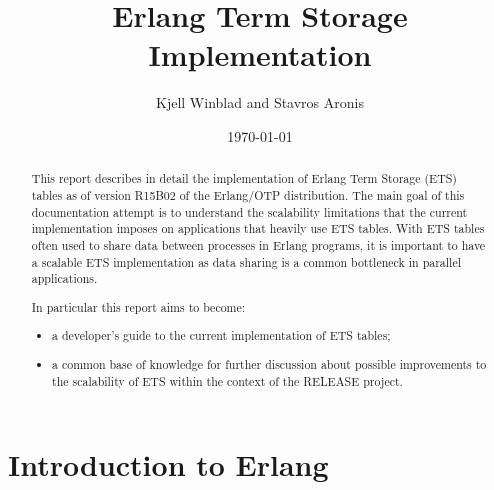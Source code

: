 \documentclass[aps,pre,preprint,nofootinbib]{revtex4}
\begin{document}
\title{Erlang Term Storage Implementation}
\author{Kjell Winblad and Stavros Aronis}
\date{\today}


\begin{abstract}

This report describes in detail the implementation of Erlang Term Storage (ETS) tables as of version R15B02 of the Erlang/OTP distribution.
The main goal of this documentation attempt is to understand the scalability limitations that the current implementation imposes on applications that heavily use ETS tables.
With ETS tables often used to share data between processes in Erlang programs, it is important to have a scalable ETS implementation as data sharing is a common bottleneck in parallel applications.

In particular this report aims to become:
\begin{itemize} 
\item a developer's guide to the current implementation of ETS tables;
\item a common base of knowledge for further discussion about possible improvements to the scalability of ETS within the context of the RELEASE project.
\end{itemize}

\end{abstract}

\maketitle

\section{Introduction to Erlang}\label{sec:erlang_intro}
\end{document}
